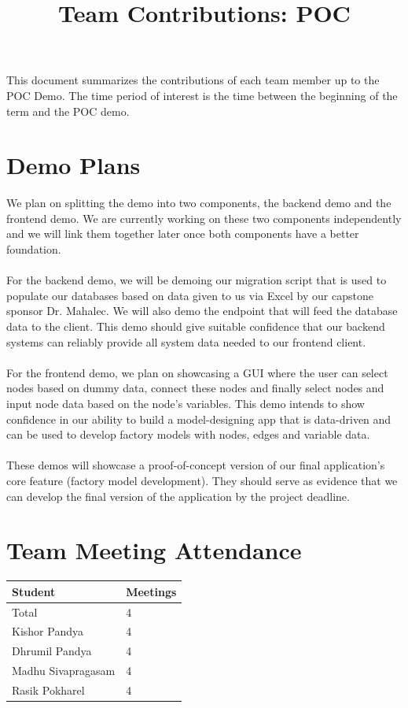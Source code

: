 \documentclass{article}
\title{Team Contributions: POC\\\progname}
\author{\authname}
\date{}
\begin{document}
\maketitle

This document summarizes the contributions of each team member up to the POC
Demo.  The time period of interest is the time between the beginning of the term
and the POC demo.

\section{Demo Plans}
We plan on splitting the demo into two components, the backend demo and the frontend demo. We are currently working on these two components independently and we will link them together later once both components have a better foundation.
\\\\
For the backend demo, we will be demoing our migration script that is used to populate our databases based on data given to us via Excel by our capstone sponsor Dr. Mahalec. We will also demo the endpoint that will feed the database data to the client. This demo should give suitable confidence that our backend systems can reliably provide all system data needed to our frontend client. 
\\\\
For the frontend demo, we plan on showcasing a GUI where the user can select nodes based on dummy data, connect these nodes and finally select nodes and input node data based on the node's variables. This demo intends to show confidence in our ability to build a model-designing app that is data-driven and can be used to develop factory models with nodes, edges and variable data. 
\\\\
These demos will showcase a proof-of-concept version of our final application's core feature (factory model development). They should serve as evidence that we can develop the final version of the application by the project deadline.

\section{Team Meeting Attendance}

\begin{table}[H]
\centering
\begin{tabular}{ll}
\toprule
\textbf{Student} & \textbf{Meetings}\\
\midrule
Total & 4\\
Kishor Pandya & 4\\
Dhrumil Pandya & 4\\
Madhu Sivapragasam & 4\\
Rasik Pokharel & 4\\
\bottomrule
\end{tabular}
\end{table}
\end{document}
